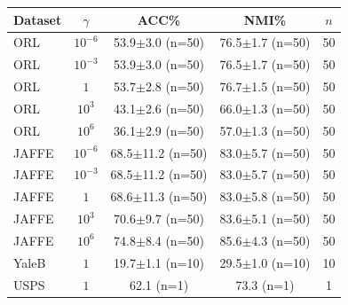 \begin{tabular}{lcccc}
\toprule
Dataset & $\gamma$ & ACC\% & NMI\% & $n$ \\
\midrule
ORL & $10^{-6}$ & 53.9$\pm$3.0 (n=50) & 76.5$\pm$1.7 (n=50) & 50 \\
ORL & $10^{-3}$ & 53.9$\pm$3.0 (n=50) & 76.5$\pm$1.7 (n=50) & 50 \\
ORL & $1$ & 53.7$\pm$2.8 (n=50) & 76.7$\pm$1.5 (n=50) & 50 \\
ORL & $10^{3}$ & 43.1$\pm$2.6 (n=50) & 66.0$\pm$1.3 (n=50) & 50 \\
ORL & $10^{6}$ & 36.1$\pm$2.9 (n=50) & 57.0$\pm$1.3 (n=50) & 50 \\
JAFFE & $10^{-6}$ & 68.5$\pm$11.2 (n=50) & 83.0$\pm$5.7 (n=50) & 50 \\
JAFFE & $10^{-3}$ & 68.5$\pm$11.2 (n=50) & 83.0$\pm$5.7 (n=50) & 50 \\
JAFFE & $1$ & 68.6$\pm$11.3 (n=50) & 83.0$\pm$5.8 (n=50) & 50 \\
JAFFE & $10^{3}$ & 70.6$\pm$9.7 (n=50) & 83.6$\pm$5.1 (n=50) & 50 \\
JAFFE & $10^{6}$ & 74.8$\pm$8.4 (n=50) & 85.6$\pm$4.3 (n=50) & 50 \\
YaleB & $1$ & 19.7$\pm$1.1 (n=10) & 29.5$\pm$1.0 (n=10) & 10 \\
USPS & $1$ & 62.1 (n=1) & 73.3 (n=1) & 1 \\
\bottomrule
\end{tabular}
